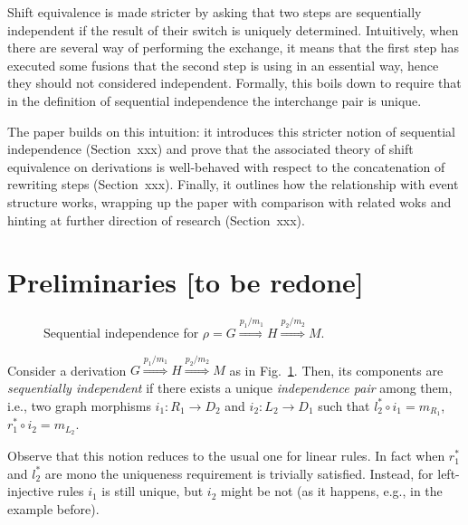 \documentclass{llncs}
\newcommand{\Rrel}[1]   {\stackrel{{#1}}{\Longrightarrow}}
\begin{document}
Shift equivalence is made stricter by asking that two steps are
sequentially independent if the result of their switch is uniquely
determined. Intuitively, when there are several way of performing the
exchange, it means that the first step has executed some fusions that
the second step is using in an essential way, hence they should not
considered independent. Formally, this boils down to require that 
in the definition of sequential independence the interchange pair is unique.

The paper builds on this intuition: it introduces this stricter notion of sequential independence
(Section~xxx) and prove that the associated theory of shift equivalence on derivations is 
well-behaved with respect to the concatenation of rewriting steps (Section~xxx).
Finally, it outlines how the relationship with event structure works, wrapping up the paper
with comparison with related woks and hinting at further direction of research (Section~xxx).


\section{Preliminaries [to be redone]}

\begin{figure}[t]
   
\caption{Sequential independence for
  $\rho = G \Rrel{p_1/m_1} H \Rrel{p_2/m_2} M$.}
\label{fi:strongseq}
\end{figure}


\begin{definition}
  \label{de:seq-ind}
  Consider a derivation $G \Rrel{p_1/m_1} H \Rrel{p_2/m_2} M$ as in
  Fig.~\ref{fi:strongseq}. Then, its components are \emph{sequentially
    independent} if there exists a unique \emph{independence pair} among
  them, i.e., two graph morphisms $i_1: R_1 \rightarrow D_2$ and
  $i_2: L_2 \rightarrow D_1$ such that $l_2^* \circ i_1 = m_{R_1}$,
  $r_1^* \circ i_2 = m_{L_2}$.
\end{definition}

Observe that this notion reduces to the usual one for linear rules. In
fact when $r_1^*$ and $l_2^*$ are mono the uniqueness requirement is
trivially satisfied. Instead, for left-injective rules $i_1$ is still
unique, but $i_2$ might be not (as it happens, e.g., in the example
before).
\end{document}
